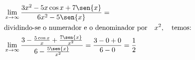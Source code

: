 \begin{ex}
\begin{align}
&\lim_{x\rightarrow \infty} \frac{3x^2-5x\cos{x}+7\sen{x}}{6x^2-5\sen{x}}=\nonumber\\
&\text{dividindo-se o numerador e o denominador por}\quad x^2,\quad\text{temos:}\nonumber\\
&\lim_{x\rightarrow \infty} \frac{3-\frac{5\cos{x}}{x}+\frac{7\sen{x}}{x^2}}{6-\frac{5\sen{x}}{x^2}}=\frac{3-0+0}{6-0}=\frac{1}{2}\nonumber
\end{align}
\end{ex}
